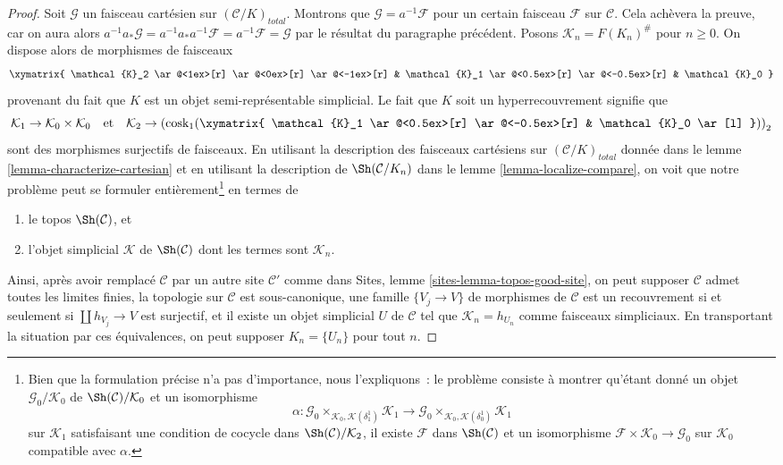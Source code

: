 \begin{proof}
\medskip\noindent
Soit $\mathcal{G}$ un faisceau cartésien sur $(\mathcal{C}/K)_{total}$.
Montrons que $\mathcal{G} = a^{-1}\mathcal{F}$ pour un certain faisceau
$\mathcal{F}$ sur $\mathcal{C}$. Cela achèvera la preuve, car
on aura alors $a^{-1}a_*\mathcal{G} = a^{-1}a_*a^{-1}\mathcal{F} =
a^{-1}\mathcal{F} = \mathcal{G}$ par le résultat du paragraphe précédent.
Posons $\mathcal{K}_n = F(K_n)^\#$ pour $n \geq 0$. On dispose alors de morphismes de faisceaux
$$
\xymatrix{
\mathcal{K}_2
\ar@<1ex>[r]
\ar@<0ex>[r]
\ar@<-1ex>[r]
&
\mathcal{K}_1
\ar@<0.5ex>[r]
\ar@<-0.5ex>[r]
&
\mathcal{K}_0
}
$$
provenant du fait que $K$ est un objet semi-représentable simplicial.
Le fait que $K$ soit un hyperrecouvrement signifie que
$$
\mathcal{K}_1 \to \mathcal{K}_0 \times \mathcal{K}_0
\quad\text{et}\quad
\mathcal{K}_2 \to
\left(\text{cosk}_1(
\xymatrix{
\mathcal{K}_1
\ar@<0.5ex>[r]
\ar@<-0.5ex>[r]
&
\mathcal{K}_0 \ar[l]
})\right)_2
$$
sont des morphismes surjectifs de faisceaux. En utilisant la description des faisceaux cartésiens sur
$(\mathcal{C}/K)_{total}$ donnée dans le lemme \ref{lemma-characterize-cartesian}
et en utilisant la description de $\Sh(\mathcal{C}/K_n)$ dans
le lemme \ref{lemma-localize-compare},
on voit que notre problème peut se formuler entièrement\footnote{Bien que
la formulation précise n'a pas d'importance, nous l'expliquons :
le problème consiste à montrer qu'étant donné un objet
$\mathcal{G}_0/\mathcal{K}_0$ de $\Sh(\mathcal{C})/\mathcal{K}_0$
et un isomorphisme
$$
\alpha :
\mathcal{G}_0 \times_{\mathcal{K}_0, \mathcal{K}(\delta^1_1)} \mathcal{K}_1 \to
\mathcal{G}_0 \times_{\mathcal{K}_0, \mathcal{K}(\delta^1_0)} \mathcal{K}_1
$$
sur $\mathcal{K}_1$ satisfaisant une condition de cocycle dans
$\Sh(\mathcal{C})/\mathcal{K}_2$, il existe
$\mathcal{F}$ dans $\Sh(\mathcal{C})$ et un isomorphisme
$\mathcal{F} \times \mathcal{K}_0 \to \mathcal{G}_0$ sur $\mathcal{K}_0$
compatible avec $\alpha$.} en termes de
\begin{enumerate}
\item le topos $\Sh(\mathcal{C})$, et
\item l'objet simplicial $\mathcal{K}$ de $\Sh(\mathcal{C})$
dont les termes sont $\mathcal{K}_n$.
\end{enumerate}
Ainsi, après avoir remplacé $\mathcal{C}$ par un autre site $\mathcal{C}'$
comme dans Sites, lemme \ref{sites-lemma-topos-good-site}, on peut supposer
$\mathcal{C}$ admet toutes les limites finies,
la topologie sur $\mathcal{C}$ est sous-canonique,
une famille $\{V_j \to V\}$ de morphismes de $\mathcal{C}$
est un recouvrement si et seulement si $\coprod h_{V_j} \to V$ est surjectif, et
il existe un objet simplicial $U$ de $\mathcal{C}$
tel que $\mathcal{K}_n = h_{U_n}$ comme faisceaux simpliciaux.
En transportant la situation par ces équivalences, on peut supposer
$K_n = \{U_n\}$ pour tout $n$.


\end{proof}
